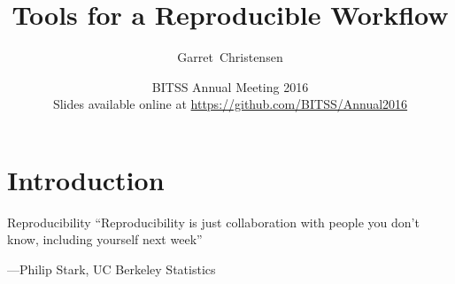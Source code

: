 \documentclass{beamer}
\title[] %
{Tools for a Reproducible Workflow}
\author[Christensen] %
{Garret~Christensen\inst{1}}
\institute[Universities of Somewhere and Elsewhere] %
{
  \inst{1}%
  UC Berkeley:\\
  Berkeley Initiative for Transparency in the Social Sciences\\
  Berkeley Institute for Data Science\\
  }
\date[BITSS2016] %
{BITSS Annual Meeting 2016\\
Slides available online at \url{https://github.com/BITSS/Annual2016}}
\begin{document}
\begin{frame}
  \titlepage
\end{frame}



\section {Introduction}
{ %
    \begin{frame}[plain]
     \end{frame}
}



 \begin{frame}{Reproducibility}
``Reproducibility is just collaboration with people you don't know,
including yourself next week''

---Philip Stark, UC Berkeley Statistics
\end{frame}
\end{document}
